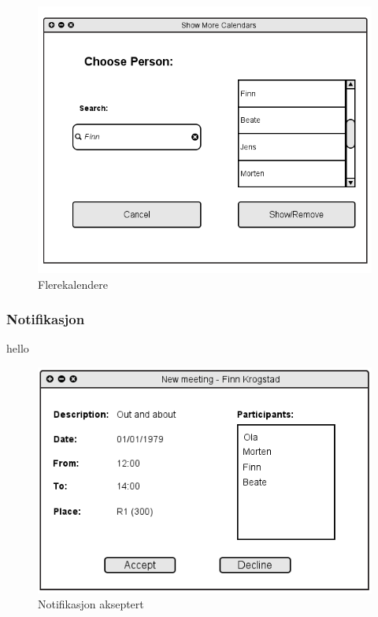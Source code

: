 \begin{figure}[H]
\centering
\includegraphics[scale=0.5]{images/flerekalendere.png}
\caption{Flerekalendere}
\label{flerekalendere_image}
\end{figure}

\subsubsection{Notifikasjon}
hello

\begin{figure}[H]
\centering
\includegraphics[scale=0.65]{images/notifikasjon_akseptert.png}
\caption{Notifikasjon akseptert}
\label{notifikasjon_akseptert_image}
\end{figure}

